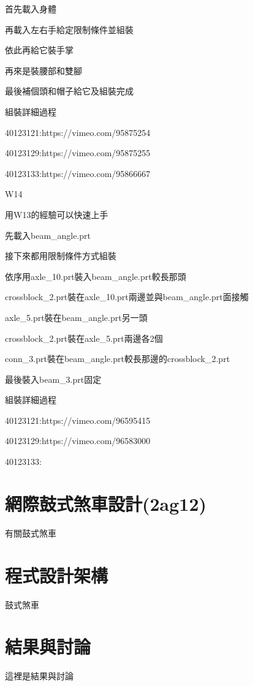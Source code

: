\documentclass[]{article}
\begin{document}
首先載入身體

再載入左右手給定限制條件並組裝

依此再給它裝手掌

再來是裝腰部和雙腳

最後補個頭和帽子給它及組裝完成

組裝詳細過程

40123121:https://vimeo.com/95875254

40123129:https://vimeo.com/95875255

40123133:https://vimeo.com/95866667

W14

用W13的經驗可以快速上手

先載入beam\_angle.prt

接下來都用限制條件方式組裝

依序用axle\_10.prt裝入beam\_angle.prt較長那頭

crossblock\_2.prt裝在axle\_10.prt兩邊並與beam\_angle.prt面接觸

axle\_5.prt裝在beam\_angle.prt另一頭

crossblock\_2.prt裝在axle\_5.prt兩邊各2個

conn\_3.prt裝在beam\_angle.prt較長那邊的crossblock\_2.prt

最後裝入beam\_3.prt固定

組裝詳細過程

40123121:https://vimeo.com/96595415

40123129:https://vimeo.com/96583000

40123133:

\section{網際鼓式煞車設計(2ag12)}\label{ux7db2ux969bux9f13ux5f0fux715eux8ecaux8a2dux8a082ag12}

有關鼓式煞車

\section{程式設計架構}\label{ux7a0bux5f0fux8a2dux8a08ux67b6ux69cb-2}

鼓式煞車

\section{結果與討論}\label{ux7d50ux679cux8207ux8a0eux8ad6-2}

這裡是結果與討論
\end{document}
